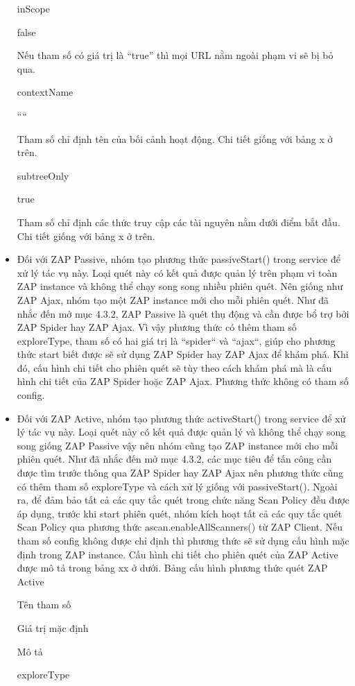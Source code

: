 \begin{itemize}
inScope

false

Nếu tham số có giá trị là “true” thì mọi URL nằm ngoài phạm vi sẽ bị bỏ qua.

contextName

““

Tham số chỉ định tên của bối cảnh hoạt động. Chi tiết giống với bảng x ở trên.

subtreeOnly

true

Tham số chỉ định các thức truy cập các tài nguyên nằm dưới điểm bắt đầu. Chi tiết giống với bảng x ở trên.

\item Đối với ZAP Passive, nhóm tạo phương thức passiveStart() trong service để xử lý tác vụ này. Loại quét này có kết quả được quản lý trên phạm vi toàn ZAP instance và không thể chạy song song nhiều phiên quét. Nên giống như ZAP Ajax, nhóm tạo một ZAP instance mới cho mỗi phiên quét. Như đã nhắc đến mở mục 4.3.2, ZAP Passive là quét thụ động và cần được bổ trợ bởi ZAP Spider hay ZAP Ajax. Vì vậy phương thức có thêm tham số exploreType, tham số có hai giá trị là “spider“ và “ajax“, giúp cho phương thức start biết được sẽ sử dụng ZAP Spider hay ZAP Ajax để khám phá. Khi đó, cấu hình chi tiết cho phiên quét sẽ tùy theo cách khám phá mà là cấu hình chi tiết của ZAP Spider hoặc ZAP Ajax. Phương thức không có tham số config. 
\item Đối với ZAP Active, nhóm tạo phương thức activeStart() trong service để xử lý tác vụ này. Loại quét này có kết quả được quản lý và không thể chạy song song giống ZAP Passive vậy nên nhóm cũng tạo ZAP instance mới cho mỗi phiên quét. Như đã nhắc đến mở mục 4.3.2, các mục tiêu để tấn công cần được tìm trước thông qua ZAP Spider hay ZAP Ajax nên phương thức cũng có thêm tham số exploreType và cách xử lý giống với passiveStart(). Ngoài ra, để đảm bảo tất cả các quy tắc quét trong chức năng Scan Policy đều được áp dụng, trước khi start phiên quét, nhóm kích hoạt tất cả các quy tắc quét Scan Policy qua phương thức ascan.enableAllScanners() từ ZAP Client. Nếu tham số config không được chỉ định thì phương thức sẽ sử dụng cấu hình mặc định trong ZAP instance. Cấu hình chi tiết cho phiên quét của ZAP Active được mô tả trong bảng xx ở dưới.
Bảng cấu hình phương thức quét ZAP Active

Tên tham số

Giá trị mặc định

Mô tả

exploreType


\end{itemize}
